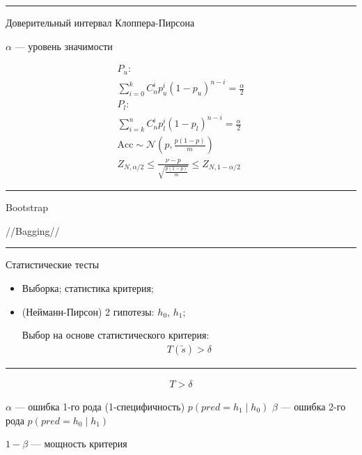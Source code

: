 \documentclass{book}
\begin{document}
\hrule
Доверительный интервал Клоппера-Пирсона

$\alpha$ --- уровень значимости

\begin{gather*}
    P_u:\\
    \sum_{i=0}^{k} {C^i_np^i_u(1-p_u)^{n-i}}=\frac{\alpha}{2}\\
    P_l:\\
    \sum_{i=k}^{n} {C^i_np^i_l(1-p_l)^{n-i}}=\frac{\alpha}{2}\\
    \mathrm{Acc} \sim \mathcal{N}\left(p, \frac{p(1-p)}{m}\right)\\
    Z_{N,\alpha/2} \leq \frac{\nu-p}{\sqrt{\frac{p(1-p)}{m}}}\leq Z_{N,1-\alpha/2}
\end{gather*}

\hrule
Bootstrap

//Bagging//

\hrule

Статистические тесты

\begin{itemize}
    \item Выборка; статистика критерия;
    \item (Нейманн-Пирсон) 2 гипотезы: $h_0$, $h_1$;

        Выбор на основе статистического критерия:
        \begin{gather*}
          T(\tilde{s}) > \delta
        \end{gather*}
\end{itemize}

\hrule

\begin{gather*}
  T>\delta
\end{gather*}


$\alpha$ --- ошибка 1-го рода  (1-специфичность) $p(pred=h_1\mid h_0)$
$\beta$ --- ошибка 2-го рода $p(pred=h_0\mid h_1)$

$1-\beta$ --- мощность критерия
\end{document}
